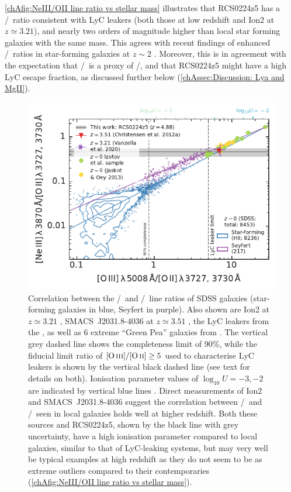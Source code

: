 \cref{chAfig:NeIII/OII line ratio vs stellar mass} illustrates that RCS0224z5 has a \NeIII/\OII\ ratio consistent with LyC leakers (both those at low redshift and Ion2 at $z \simeq 3.21$), and nearly two orders of magnitude higher than local star forming galaxies with the same mass. This agrees with recent findings of enhanced \NeIII/\OII\ ratios in star-forming galaxies at $z \sim 2$ \citep{2015ApJ...798...29Z, 2020ApJ...902L..16J}. Moreover, this is in agreement with the expectation that \NeIII/\OII\ is a proxy of \OIIIf/\OII, and that RCS0224z5 might have a high LyC escape fraction, as discussed further below (\cref{chAssec:Discussion: Lya and MgII}).
\begin{figure}
    \centering
    \includegraphics[width=0.6\linewidth]{"Plots/ChapterA/SDSS_NeIII-OII_vs_OIII-OII_DR7"}
    \caption[Correlation between the \NeIII/\OII\ and \OIIIf/\OII\ line ratios of SDSS galaxies]{Correlation between the \NeIII/\OII\ and \OIIIf/\OII\ line ratios of SDSS galaxies (star-forming galaxies in blue, Seyfert in purple). Also shown are Ion2 at $z \simeq 3.21$ \citep{2020MNRAS.491.1093V}, SMACS~J2031.8-4036 at $z \simeq 3.51$ \citep{2012MNRAS.427.1953C}, the LyC leakers from the \Isample, as well as $6$ extreme ``Green Pea'' galaxies from \citet{2013ApJ...766...91J}. The vertical grey dashed line shows the completeness limit of 90\%, while the fiducial limit ratio of $\OIIIf/\OII \geq 5$ used to characterise LyC leakers is shown by the vertical black dashed line (see text for details on both). Ionisation parameter values of $\log_{10} U = -3, -2$ are indicated by vertical blue lines \citep[see \cref{chAeq:OIII/OII logU diagnostic}, derived by][]{2000MNRAS.318..462D}. Direct measurements of Ion2 and SMACS~J2031.8-4036 suggest the correlation between \NeIII/\OII\ and \OIIIf/\OII\ seen in local galaxies holds well at higher redshift. Both these sources and RCS0224z5, shown by the black line with grey uncertainty, have a high ionisation parameter compared to local galaxies, similar to that of LyC-leaking systems, but may very well be typical examples at high redshift as they do not seem to be as extreme outliers compared to their contemporaries (\cref{chAfig:NeIII/OII line ratio vs stellar mass}).}
    \label{chAfig:NeIII/OII vs OIII/OII line ratios}
\end{figure}

